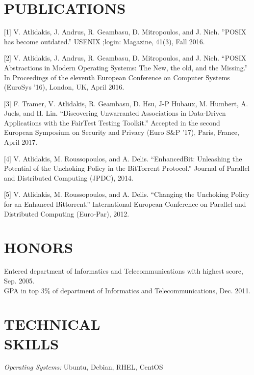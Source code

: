 \documentclass[overlapped,9pt]{res}
\begin{document}
\begin{resume}
\section{PUBLICATIONS}
  [1] V. Atlidakis, J. Andrus, R. Geambasu, D. Mitropoulos, and J. Nieh.
  ''POSIX has become outdated.'' USENIX ;login: Magazine, 41(3), Fall 2016.

  [2]  V. Atlidakis, J. Andrus, R. Geambasu, D. Mitropoulos, and J. Nieh.
  ``POSIX Abstractions in Modern Operating Systems: The New, the old, and
  the Missing.'' In Proceedings of the eleventh European Conference on Computer
  Systems (EuroSys '16), London, UK, April 2016.

  [3] F. Tramer, V. Atlidakis, R. Geambasu, D. Hsu, J-P Hubaux, M. Humbert,
  A. Juels, and H. Lin. ``Discovering Unwarranted Associations in Data-Driven
  Applications with the FairTest Testing Toolkit.'' Accepted in the second
  European Symposium on Security and Privacy (Euro S\&P '17), Paris, France,
  April 2017.

  [4] V. Atlidakis, M. Roussopoulos, and A. Delis.
  ``EnhancedBit: Unleashing the Potential of the Unchoking Policy in the
  BitTorrent Protocol.'' Journal of Parallel and Distributed Computing (JPDC),
  2014.

  [5] V. Atlidakis, M. Roussopoulos, and A. Delis.
  ``Changing the Unchoking Policy for an Enhanced Bittorrent.'' International
  European Conference on Parallel and Distributed Computing (Euro-Par), 2012.

\section{HONORS}
  \vspace{5pt}
  Entered department of Informatics and Telecommunications with highest score, Sep. 2005.\\

  \vspace{-20pt}
  GPA in top 3\% of department of Informatics and Telecommunications, Dec. 2011.

\section{TECHNICAL \\ SKILLS}

  \vspace{5pt}
  {\sl Operating Systems:} Ubuntu, Debian, RHEL, CentOS \\


\end{resume}
\end{document}
